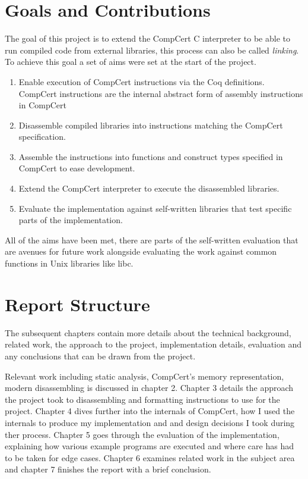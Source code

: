 \section{Goals and Contributions}\label{project-goal}

The goal of this project is to extend the CompCert C interpreter to be able to run compiled code from external libraries, this process can also be called \textit{linking}. To achieve this goal a set of aims were set at the start of the project.

\begin{enumerate}
\item
  Enable execution of CompCert instructions via the Coq definitions. CompCert instructions are the internal abstract form of assembly instructions in CompCert
\item
  Disassemble compiled libraries into instructions matching the CompCert
  specification.
\item
  Assemble the instructions into functions and construct types specified in CompCert to ease development.
\item
  Extend the CompCert interpreter to execute the disassembled libraries. 
\item
  Evaluate the implementation against self-written libraries that test specific parts of the implementation.
\end{enumerate}


All of the aims have been met, there are parts of the self-written evaluation that are avenues for future work alongside evaluating the work against common functions in Unix libraries like libc.

\section{Report Structure}\label{report-structure}
The subsequent chapters contain more details about the technical background, related work, the approach to the project, implementation details, evaluation and any conclusions that can be drawn from the project.

Relevant work including static analysis, CompCert's memory representation, modern disassembling is discussed in chapter 2. Chapter 3 details the approach the project took to disassembling and formatting instructions to use for the project. Chapter 4 dives further into the internals of CompCert, how I used the internals to produce my implementation and and design decisions I took during ther process. Chapter 5 goes through the evaluation of the implementation, explaining how various example programs are executed and where care has had to be taken for edge cases. Chapter 6 examines related work in the subject area and chapter 7 finishes the report with a brief conclusion.